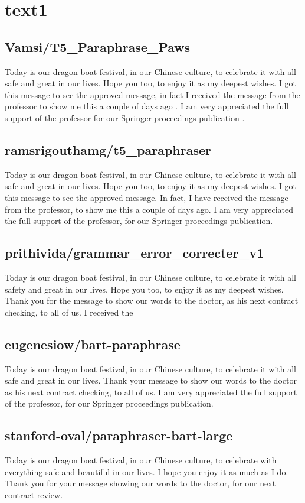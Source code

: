 \section*{text1}
\subsection*{Vamsi/T5_Paraphrase_Paws}
Today is our dragon boat festival, in our Chinese culture, to celebrate it with all safe and great in our lives. Hope you too, to enjoy it as my deepest wishes. I got this message to see the approved message, in fact I received the message from the professor to show me this a couple of days ago . I am very appreciated the full support of the professor for our Springer proceedings publication .

\subsection*{ramsrigouthamg/t5_paraphraser}
Today is our dragon boat festival, in our Chinese culture, to celebrate it with all safe and great in our lives. Hope you too, to enjoy it as my deepest wishes. I got this message to see the approved message. In fact, I have received the message from the professor, to show me this a couple of days ago. I am very appreciated the full support of the professor, for our Springer proceedings publication.

\subsection*{prithivida/grammar_error_correcter_v1}
Today is our dragon boat festival, in our Chinese culture, to celebrate it with all safety and great in our lives. Hope you too, to enjoy it as my deepest wishes. Thank you for the message to show our words to the doctor, as his next contract checking, to all of us. I received the

\subsection*{eugenesiow/bart-paraphrase}
Today is our dragon boat festival, in our Chinese culture, to celebrate it with all safe and great in our lives. Thank your message to show our words to the doctor as his next contract checking, to all of us. I am very appreciated the full support of the professor, for our Springer proceedings publication.

\subsection*{stanford-oval/paraphraser-bart-large}
Today is our dragon boat festival, in our Chinese culture, to celebrate with everything safe and beautiful in our lives. I hope you enjoy it as much as I do. Thank you for your message showing our words to the doctor, for our next contract review.

